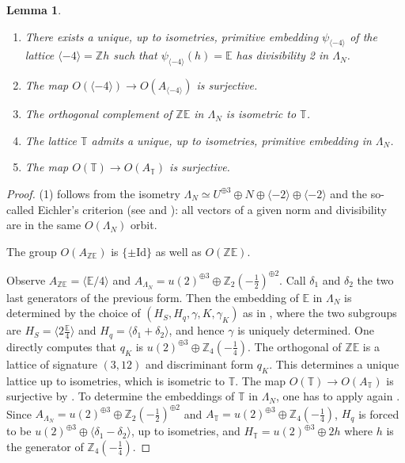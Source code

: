 \documentclass{amsart}
\newtheorem{lemma}[thm]{Lemma}
\theoremstyle{definition}
\numberwithin{equation}{section}
\numberwithin{equation}{section} \theoremstyle{definition}
\newcommand{\ra}{\rightarrow}
\newcommand\Z{\mathbb{Z}}
\begin{document}
\begin{lemma}\label{lemma: embeddings of <-4> and T in LambdaN}
\begin{enumerate}
\item
There exists a unique, up to isometries, primitive embedding $\psi_{\langle-4\rangle}$ of the lattice $\langle -4\rangle=\Z h$ such that $\psi_{\langle -4\rangle}(h)=\mathbb{E}$ has divisibility 2 in $\Lambda_N$. 
\item The map $O(\langle -4\rangle)\ra O(A_{\langle -4\rangle})$ is surjective.
\item The orthogonal complement of $\Z \mathbb{E}$ in $\Lambda_N$ is isometric to $\mathbb{T}$.
\item The lattice $\mathbb{T}$ admits a unique, up to isometries, primitive embedding in $\Lambda_N$.
\item The map $O(\mathbb{T})\ra O(A_{\mathbb{T}})$ is surjective.
\end{enumerate}
\end{lemma}
\begin{proof}
(1) follows from the isometry $\Lambda_N\simeq U^{\oplus 3}\oplus N\oplus \langle -2\rangle\oplus \langle -2\rangle$ and the so-called Eichler's criterion (see \cite[Satz 10.4]{Ei} and \cite[Lemma 7.8]{GHS}): all vectors of a given norm and divisibility are in the same  $O(\Lambda_N)$ orbit.


The group  $O(A_{\Z\mathbb{E}})$ is $\{\pm \mathrm{Id}\}$ as well as $O(\Z\mathbb{E})$.

Observe $A_{\Z\mathbb{E}}=\langle \mathbb{E}/4\rangle$ and $A_{\Lambda_N}=u(2)^{\oplus 3}\oplus \mathbb{Z}_2\left(-\frac{1}{2}\right)^{\oplus 2}$. Call $\delta_1$ and $\delta_2$ the two last generators of the previous form. Then the embedding of $\mathbb{E}$ in $\Lambda_N$ is determined by the choice of $(H_S,H_q,\gamma,K,\gamma_K)$  as in \cite[Proposition 1.15.1]{N}, where the two subgroups are $H_S=\langle 2\frac{\mathbb{E}}{4}\rangle$ and $H_q=\langle\delta_1+\delta_2\rangle$, and hence $\gamma$ is uniquely determined. One directly computes that $q_K$ is $u(2)^{\oplus 3}\oplus \mathbb{Z}_4\left(-\frac{1}{4}\right)$. The orthogonal of $\Z\mathbb{E}$ is a lattice of signature $(3,12)$ and discriminant form $q_K$. This determines a unique lattice up to isometries, which is isometric to $\mathbb{T}$. The map $O(\mathbb{T})\ra O(A_{\mathbb{T}})$ is surjective by \cite[Theorem 1.14.2]{N}. To determine the embeddings of $\mathbb{T}$ in $\Lambda_N$, one has to apply again \cite[Proposition 1.15.1]{N}. Since $A_{\Lambda_N}=u(2)^{\oplus 3}\oplus \mathbb{Z}_2\left(-\frac{1}{2}\right)^{\oplus 2}$ and $A_{\mathbb{T}}= u(2)^{\oplus 3}\oplus \mathbb{Z}_4\left(-\frac{1}{4}\right)$, $H_{q}$ is forced to be $u(2)^{\oplus 3}\oplus \langle\delta_1-\delta_2\rangle$, up to isometries, and $H_{\mathbb{T}}=u(2)^{\oplus 3}\oplus 2h$ where $h$ is the generator of $\mathbb{Z}_4\left(-\frac{1}{4}\right)$.
\end{proof}
\end{document}
